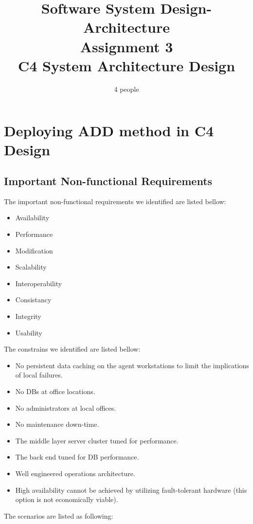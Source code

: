 \documentclass{article}
\title{Software System Design-Architecture\\Assignment 3\\C4 System Architecture Design}
\author{4 people}
\begin{document}
	\maketitle
	\newpage
	\section{Deploying ADD method in C4 Design}
	\subsection{Important Non-functional Requirements}
	The important non-functional requirements we identified are listed bellow:
	\begin{itemize}
		\item {Availability}
		\item {Performance}
		\item {Modification}
		\item {Scalability}
		\item {Interoperability}
		\item {Consistancy}
		\item {Integrity}
		\item {Usability}
	\end{itemize}
	The constrains we identified are listed bellow:

	\begin{itemize}
		\item No persistent data caching on the agent workstations to limit the implications of local failures.
		\item No DBs at office locations.
		\item No administrators at local offices.
		\item No maintenance down-time.
		\item The middle layer server cluster tuned for performance.
		\item The back end tuned for DB performance.
		\item Well engineered operations architecture.
		\item High availability cannot be achieved by utilizing fault-tolerant hardware (this option is not
		economically viable).
	\end{itemize}
	The scenarios are listed as following:
\end{document}

